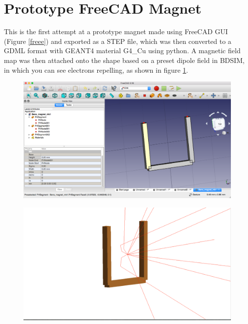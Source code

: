 \documentclass[12pt,a4paper]{article}
\begin{document}
\small


\section{Prototype FreeCAD Magnet}
\label{mag}
This is the first attempt at a prototype magnet made using FreeCAD GUI (Figure \ref{freee}) and exported as a STEP file, which was then converted to a GDML format with GEANT4 material G4\_Cu using python. A magnetic field map was then attached onto the shape based on a preset dipole field in BDSIM, in which you can see electrons repelling, as shown in figure \ref{repel}.

\begin{figure}[h!]
\centering
\begin{minipage}{.5\textwidth}
  \centering
  \includegraphics[height=0.5\linewidth]{Images//CAD_Mag//maginfreeCAD.png}
  \label{freee}
\end{minipage}%
\begin{minipage}{.5\textwidth}
  \centering
  \includegraphics[height=.5\linewidth]{Images//CAD_Mag//maginbdsim.png}
  \label{repel}
\end{minipage}%
\end{figure}
\end{document}
